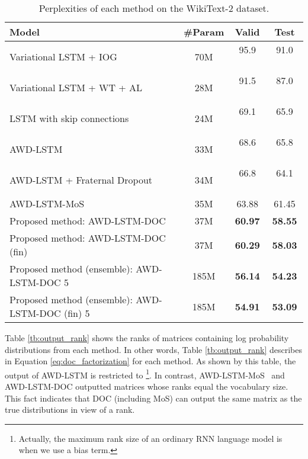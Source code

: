 \documentclass[11pt,a4paper]{article}
\begin{document}
\begin{table*}[!t]
  \centering
  \small
  \begin{tabular}{| l | c | c c |} \hline
  Model & \#Param & Valid & Test \\ \hline
  Variational LSTM + IOG \cite{takase-suzuki-nagata:2017:I17-2} & 70M & 95.9  \ \  & 91.0 \ \  \\
  Variational LSTM + WT + AL \cite{DBLP:journals/corr/InanKS16} & 28M & 91.5  \ \ & 87.0 \ \  \\
  LSTM with skip connections \cite{DBLP:journals/corr/MelisDB17} & 24M & 69.1  \ \  & 65.9 \ \  \\
  AWD-LSTM \cite{merityRegOpt} & 33M & 68.6  \ \  & 65.8 \ \  \\
  AWD-LSTM + Fraternal Dropout \cite{fraternal} & 34M & 66.8  \ \  & 64.1 \ \  \\
  AWD-LSTM-MoS \cite{DBLP:journals/corr/abs-1711-03953} & 35M & 63.88 & 61.45 \\ \hline
  Proposed method: AWD-LSTM-DOC & 37M & {\bf 60.97} & {\bf 58.55} \\
  Proposed method: AWD-LSTM-DOC (fin) & 37M & {\bf 60.29} & {\bf 58.03} \\
  Proposed method (ensemble): AWD-LSTM-DOC  5 & 185M & {\bf 56.14} & {\bf 54.23} \\
  Proposed method (ensemble): AWD-LSTM-DOC (fin)  5 & 185M & {\bf 54.91} & {\bf 53.09} \\ \hline
  \end{tabular}
  \caption{Perplexities of each method on the WikiText-2 dataset.\label{tb:perplexityOnWikitext}}
\end{table*}



Table \ref{tb:output_rank} shows the ranks of matrices containing log probability distributions from each method.
In other words, Table \ref{tb:output_rank} describes  in Equation \ref{eq:doc_factorization} for each method.
As shown by this table, the output of AWD-LSTM is restricted to \footnote{Actually, the maximum rank size of an ordinary RNN language model is  when we use a bias term.}.
In contrast, AWD-LSTM-MoS~\cite{DBLP:journals/corr/abs-1711-03953} and AWD-LSTM-DOC outputted matrices whose ranks equal the vocabulary size.
This fact indicates that DOC (including MoS) can output the same matrix as the true distributions in view of a rank.
\end{document}

